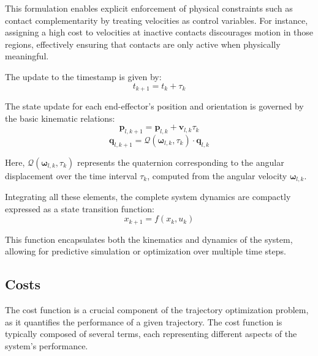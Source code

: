 \documentclass[main.tex]{subfiles}
\begin{document}
This formulation enables explicit enforcement of physical constraints such as contact complementarity by treating velocities as control variables. For instance, assigning a high cost to velocities at inactive contacts discourages motion in those regions, effectively ensuring that contacts are only active when physically meaningful.

The update to the timestamp is given by:
\begin{equation}
    t_{k+1} = t_k + \tau_k
\end{equation}

The state update for each end-effector’s position and orientation is governed by the basic kinematic relations:
\begin{equation}
    \mathbf{p}_{l,k+1} = \mathbf{p}_{l,k} + \mathbf{v}_{l,k} \tau_k
\end{equation}
\begin{equation}
    \mathbf{q}_{l,k+1} = \mathcal{Q}(\boldsymbol{\omega}_{l,k}, \tau_k) \cdot \mathbf{q}_{l,k}
\end{equation}

Here, $\mathcal{Q}(\boldsymbol{\omega}_{l,k}, \tau_k)$ represents the quaternion corresponding to the angular displacement over the time interval $\tau_k$, computed from the angular velocity $\boldsymbol{\omega}_{l,k}$.

Integrating all these elements, the complete system dynamics are compactly expressed as a state transition function:
\begin{equation}
    x_{k+1} = f(x_k, u_k)
\end{equation}

This function encapsulates both the kinematics and dynamics of the system, allowing for predictive simulation or optimization over multiple time steps.
\subsection{Costs}
The cost function is a crucial component of the trajectory optimization problem, as it quantifies the performance of a given trajectory. The cost function is typically composed of several terms, each representing different aspects of the system's performance.
\end{document}
